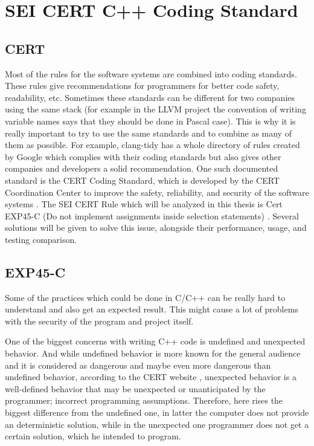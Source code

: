 \section{SEI CERT C++ Coding Standard}

\subsection{CERT}
\label{section:cert}

Most of the rules for the software systems are combined into coding standards. These rules give recommendations for programmers for better code safety, readability, etc. Sometimes these standards can be different for two companies using the same stack (for example in the LLVM project the convention of writing variable names says that they should be done in Pascal case). This is why it is really important to try to use the same standards and to combine as many of them as possible. For example, clang-tidy has a whole directory of rules created by Google which complies with their coding standards but also gives other companies and developers a solid recommendation. One such documented standard is the CERT Coding Standard, which is developed by the CERT Coordination Center to improve the safety, reliability, and security of the software systems \cite{sei-cert} \cite{wiki-cert}. The SEI CERT Rule which will be analyzed in this thesis is Cert EXP45-C  (Do not implement assignments inside selection statements) \cite{cert-45}. Several solutions will be given to solve this issue, alongside their performance, usage, and testing comparison. 

\subsection{EXP45-C}
\label{section:exp45-c}

Some of the practices which could be done in C/C++ can be really hard to understand and also get an expected result. This might cause a lot of problems with the security of the program and project itself.

One of the biggest concerns with writing C++ code is undefined and unexpected behavior. And while undefined behavior is more known for the general audience and it is considered as dangerous and maybe even more dangerous than undefined behavior, according to the CERT website \cite{cert-unexpected}, unexpected behavior is a well-defined behavior that may be unexpected or unanticipated by the programmer; incorrect programming assumptions. Therefore, here rises the biggest difference from the undefined one, in latter the computer does not provide an deterministic solution, while in the unexpected one programmer does not get a certain solution, which he intended to program.

